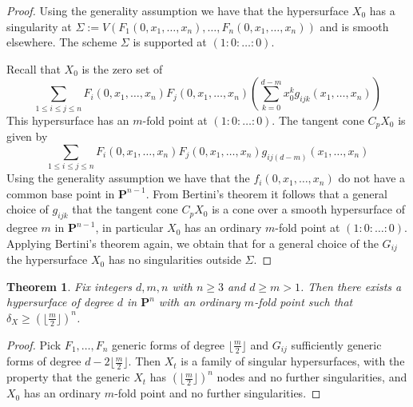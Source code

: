 \documentclass{amsart}
\newcommand{\Ps}{\mathbf{P}}
\newtheorem{theorem}[lemma]{Theorem}
\theoremstyle{definition}
\theoremstyle{remark}
\begin{document}
\begin{proof} Using the generality assumption we have that the hypersurface $X_0$ has a singularity at $\Sigma:=V(F_1(0,x_1,\dots,x_n),\dots,{F}_n(0,x_1,\dots,x_n))$ and is smooth elsewhere.  The scheme  $\Sigma$ is supported at $(1:0:\dots:0)$.

Recall that  $X_0$ is the zero set of 
\[ \sum_{1\leq i \leq j \leq n} F_i(0,x_1,\dots,x_n)F_j(0,x_1,\dots,x_n)\left(\sum_{k=0}^{d-m} x_0^{k} g_{ijk}(x_1,\dots,x_n)\right)\]
This hypersurface has an $m$-fold point at $(1:0:\dots:0)$. The tangent cone $C_pX_0$ is given by
\[ \sum_{1\leq i\leq j\leq n} F_i(0,x_1,\dots,x_n)F_j(0,x_1,\dots,x_n) g_{ij(d-m)}(x_1,\dots,x_n)\]
Using the generality assumption we have that  the $f_i(0,x_1,\dots,x_n)$ do not have a common base point in $\Ps^{n-1}$. From Bertini's theorem it follows  that  a general choice of $g_{ijk}$  that the tangent cone $C_pX_0$ is a cone over a smooth hypersurface of degree $m$ in $\Ps^{n-1}$, in particular $X_0$ has an ordinary $m$-fold point at $(1:0:\dots:0)$. 
Applying  Bertini's theorem again, we obtain that for a general choice of the $G_{ij}$ the hypersurface $X_0$ has no singularities outside $\Sigma$.
\end{proof}

\begin{theorem}\label{thmExist} Fix integers $d,m,n$ with $n\geq 3$ and  $d\geq m>1$. Then there exists a hypersurface of degree $d$ in $\Ps^n$ with an ordinary $m$-fold point such that  $\delta_{X}\geq \left(  \lfloor \frac{m}{2}\rfloor \right)^n$.
\end{theorem}

\begin{proof} Pick $F_1,\dots,F_n$ generic forms of degree $\lfloor \frac{m}{2} \rfloor$ and $G_{ij}$ sufficiently generic forms of degree $d-2\lfloor \frac{m}{2}\rfloor$. Then $X_t$ is a family of singular hypersurfaces, with the property that the generic $X_t$ has $(\lfloor \frac{m}{2} \rfloor)^n$ nodes and no further singularities, and $X_0$  has an ordinary $m$-fold point and no further singularities.
\end{proof}
\end{document}
